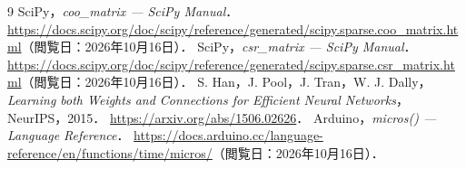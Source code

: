 \documentclass[a4paper,11pt]{article}
\begin{document}
\begin{thebibliography}{9}
  \small
   SciPy，\textit{coo\_matrix --- SciPy Manual}．
  \url{https://docs.scipy.org/doc/scipy/reference/generated/scipy.sparse.coo_matrix.html}（閲覧日：2026年10月16日）．
   SciPy，\textit{csr\_matrix --- SciPy Manual}．
  \url{https://docs.scipy.org/doc/scipy/reference/generated/scipy.sparse.csr_matrix.html}（閲覧日：2026年10月16日）．
   S. Han，J. Pool，J. Tran，W. J. Dally，\textit{Learning both Weights and Connections for Efficient Neural Networks}，NeurIPS，2015．
  \url{https://arxiv.org/abs/1506.02626}．
   Arduino，\textit{micros() --- Language Reference}．
  \url{https://docs.arduino.cc/language-reference/en/functions/time/micros/}（閲覧日：2026年10月16日）．
\end{thebibliography}
\end{document}
